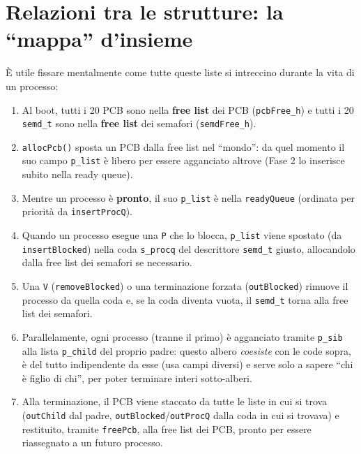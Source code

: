 \documentclass[11pt,a4paper]{article}
\newcommand{\code}[1]{\texttt{#1}}
\begin{document}
\section{Relazioni tra le strutture: la ``mappa'' d'insieme}

\`E utile fissare mentalmente come tutte queste liste si intreccino durante
la vita di un processo:

\begin{enumerate}
\item Al boot, tutti i 20 PCB sono nella \textbf{free list} dei PCB
  (\code{pcbFree\_h}) e tutti i 20 \code{semd\_t} sono nella \textbf{free
  list} dei semafori (\code{semdFree\_h}).
\item \code{allocPcb()} sposta un PCB dalla free list nel ``mondo'': da quel
  momento il suo campo \code{p\_list} è libero per essere agganciato altrove
  (Fase 2 lo inserisce subito nella ready queue).
\item Mentre un processo è \textbf{pronto}, il suo \code{p\_list} è nella
  \code{readyQueue} (ordinata per priorità da \code{insertProcQ}).
\item Quando un processo esegue una \code{P} che lo blocca, \code{p\_list}
  viene spostato (da \code{insertBlocked}) nella coda \code{s\_procq} del
  descrittore \code{semd\_t} giusto, allocandolo dalla free list dei
  semafori se necessario.
\item Una \code{V} (\code{removeBlocked}) o una terminazione forzata
  (\code{outBlocked}) rimuove il processo da quella coda e, se la coda
  diventa vuota, il \code{semd\_t} torna alla free list dei semafori.
\item Parallelamente, ogni processo (tranne il primo) è agganciato tramite
  \code{p\_sib} alla lista \code{p\_child} del proprio padre: questo albero
  \emph{coesiste} con le code sopra, è del tutto indipendente da esse (usa
  campi diversi) e serve solo a sapere ``chi è figlio di chi'', per poter
  terminare interi sotto-alberi.
\item Alla terminazione, il PCB viene staccato da tutte le liste in cui si
  trova (\code{outChild} dal padre, \code{outBlocked}/\code{outProcQ} dalla
  coda in cui si trovava) e restituito, tramite \code{freePcb}, alla free
  list dei PCB, pronto per essere riassegnato a un futuro processo.
\end{enumerate}

\end{document}
